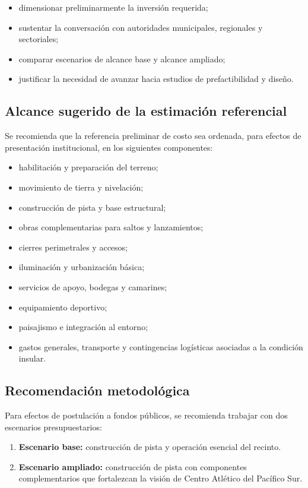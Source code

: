 \documentclass[12pt,letterpaper]{article}
\begin{document}
\begin{itemize}
    \item dimensionar preliminarmente la inversión requerida;
    \item sustentar la conversación con autoridades municipales, regionales y sectoriales;
    \item comparar escenarios de alcance base y alcance ampliado;
    \item justificar la necesidad de avanzar hacia estudios de prefactibilidad y diseño.
\end{itemize}

\subsection{Alcance sugerido de la estimación referencial}

Se recomienda que la referencia preliminar de costo sea ordenada, para efectos de presentación institucional, en los siguientes componentes:

\begin{itemize}
    \item habilitación y preparación del terreno;
    \item movimiento de tierra y nivelación;
    \item construcción de pista y base estructural;
    \item obras complementarias para saltos y lanzamientos;
    \item cierres perimetrales y accesos;
    \item iluminación y urbanización básica;
    \item servicios de apoyo, bodegas y camarines;
    \item equipamiento deportivo;
    \item paisajismo e integración al entorno;
    \item gastos generales, transporte y contingencias logísticas asociadas a la condición insular.
\end{itemize}

\subsection{Recomendación metodológica}

Para efectos de postulación a fondos públicos, se recomienda trabajar con dos escenarios presupuestarios:

\begin{enumerate}
    \item \textbf{Escenario base:} construcción de pista y operación esencial del recinto.
    \item \textbf{Escenario ampliado:} construcción de pista con componentes complementarios que fortalezcan la visión de Centro Atlético del Pacífico Sur.
\end{enumerate}
\end{document}
